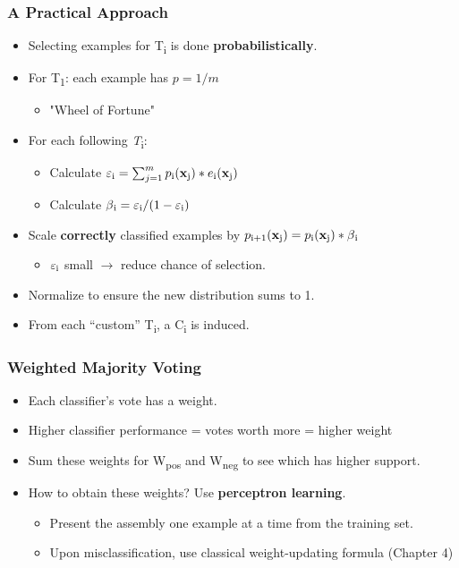 \documentclass{beamer}
\begin{document}
\begin{frame}
\frametitle{A Practical Approach}
\begin{itemize}
\item Selecting examples for T\textsubscript{i} is done \textbf{probabilistically}. 
\item For T\textsubscript{1}: each example has $p = 1 / m$
\begin{itemize}
\item "Wheel of Fortune" 
\end{itemize}
\item For each following \textit{T}\textsubscript{i}: 
\begin{itemize}
\item Calculate $\varepsilon\textsubscript{i} = \sum_{j=1}^{m} p\textsubscript{i}(\textbf{x}\textsubscript{j}) * e\textsubscript{i}(\textbf{x}\textsubscript{j})$
\item Calculate $\beta\textsubscript{i} = \varepsilon\textsubscript{i} / (1 - \varepsilon\textsubscript{i}) $
\end{itemize}
\item Scale \textbf{correctly} classified examples by $p\textsubscript{i+1}(\textbf{x}\textsubscript{j}) = p\textsubscript{i}(\textbf{x}\textsubscript{j}) * \beta\textsubscript{i}$
\begin{itemize}
\item $\varepsilon\textsubscript{i}$ small $\rightarrow$ reduce chance of selection. 
\end{itemize}
\item Normalize to ensure the new distribution sums to 1.  
\item From each ``custom'' T\textsubscript{i}, a C\textsubscript{i} is induced.
\end{itemize}
\end{frame}
\begin{frame}
\frametitle{Weighted Majority Voting}
\begin{itemize}
\item Each classifier's vote has a weight.
\item Higher classifier performance = votes worth more = higher weight
\item Sum these weights for W\textsubscript{pos} and W\textsubscript{neg} to see which has higher support. 
\item How to obtain these weights? Use \textbf{perceptron learning}. 
\begin{itemize}
\item Present the assembly one example at a time from the training set.
\item Upon misclassification, use classical weight-updating formula (Chapter 4)
\end{itemize}
\end{itemize}

\end{frame}
\end{document}
